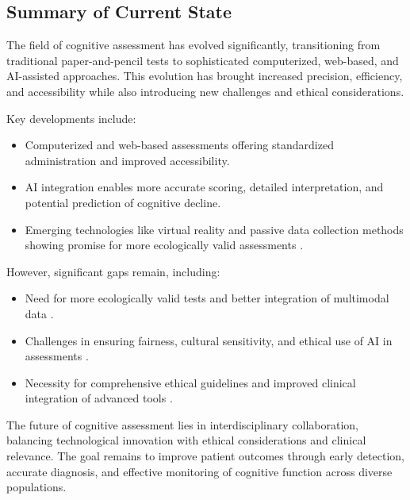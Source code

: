 \subsection{Summary of Current State}
The field of cognitive assessment has evolved significantly, transitioning from traditional paper-and-pencil tests to sophisticated computerized, web-based, and AI-assisted approaches. This evolution has brought increased precision, efficiency, and accessibility while also introducing new challenges and ethical considerations.

Key developments include:
\begin{itemize}
    \item Computerized and web-based assessments offering standardized administration and improved accessibility.
    \item AI integration enables more accurate scoring, detailed interpretation, and potential prediction of cognitive decline.
    \item Emerging technologies like virtual reality and passive data collection methods showing promise for more ecologically valid assessments \cite{Parsons2018}.
\end{itemize}

However, significant gaps remain, including:
\begin{itemize}
    \item Need for more ecologically valid tests and better integration of multimodal data \cite{Parsons2021}.
    \item Challenges in ensuring fairness, cultural sensitivity, and ethical use of AI in assessments \cite{Birhane2021}.
    \item Necessity for comprehensive ethical guidelines and improved clinical integration of advanced tools \cite{Rudin2019}.
\end{itemize}

The future of cognitive assessment lies in interdisciplinary collaboration, balancing technological innovation with ethical considerations and clinical relevance. The goal remains to improve patient outcomes through early detection, accurate diagnosis, and effective monitoring of cognitive function across diverse populations.
